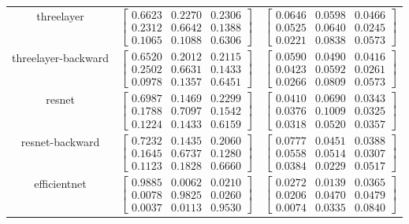 \documentclass{article} %
\begin{document}
\begin{table}
\begin{tabular}{ccc}
threelayer & $\begin{bmatrix}0.6623 & 0.2270 & 0.2306\\0.2312 & 0.6642 & 0.1388\\0.1065 & 0.1088 & 0.6306\end{bmatrix}$ & $\begin{bmatrix}0.0646 & 0.0598 & 0.0466\\0.0525 & 0.0640 & 0.0245\\0.0221 & 0.0838 & 0.0573\end{bmatrix}$\\
threelayer-backward & $\begin{bmatrix}0.6520 & 0.2012 & 0.2115\\0.2502 & 0.6631 & 0.1433\\0.0978 & 0.1357 & 0.6451\end{bmatrix}$ & $\begin{bmatrix}0.0590 & 0.0490 & 0.0416\\0.0423 & 0.0592 & 0.0261\\0.0266 & 0.0809 & 0.0573\end{bmatrix}$\\
resnet & $\begin{bmatrix}0.6987 & 0.1469 & 0.2299\\0.1788 & 0.7097 & 0.1542\\0.1224 & 0.1433 & 0.6159\end{bmatrix}$ & $\begin{bmatrix}0.0410 & 0.0690 & 0.0343\\0.0376 & 0.1009 & 0.0325\\0.0318 & 0.0520 & 0.0357\end{bmatrix}$\\
resnet-backward & $\begin{bmatrix}0.7232 & 0.1435 & 0.2060\\0.1645 & 0.6737 & 0.1280\\0.1123 & 0.1828 & 0.6660\end{bmatrix}$ & $\begin{bmatrix}0.0777 & 0.0451 & 0.0388\\0.0558 & 0.0514 & 0.0307\\0.0384 & 0.0229 & 0.0517\end{bmatrix}$\\
efficientnet & $\begin{bmatrix}0.9885 & 0.0062 & 0.0210\\0.0078 & 0.9825 & 0.0260\\0.0037 & 0.0113 & 0.9530\end{bmatrix}$ & $\begin{bmatrix}0.0272 & 0.0139 & 0.0365\\0.0206 & 0.0470 & 0.0479\\0.0074 & 0.0335 & 0.0840\end{bmatrix}$\\

\end{tabular}
\end{table}
\end{document}
